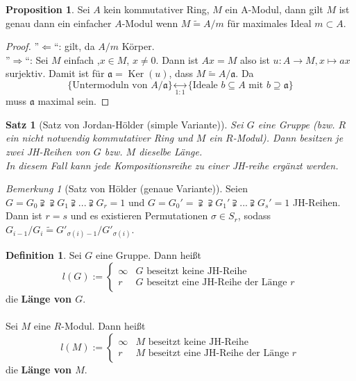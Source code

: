 \documentclass[10pt,a4paper]{article}
\newcommand{\isomorph}{\ensuremath{\tilde{=}}}
\newcommand{\Ker}{\ensuremath{\operatorname{Ker}}}
\newcounter{thm}[section]
\theoremstyle{definition}
\newtheorem{definition}[thm]{Definition}
\newtheorem{prop}[thm]{Proposition}
\theoremstyle{plain}
\newtheorem{satz}[thm]{Satz}
\theoremstyle{remark}
\newtheorem*{bem*}{Bemerkung}
\begin{document}
\begin{prop}
	Sei $A$ kein kommutativer Ring, $M$ ein A-Modul, dann gilt $M$ ist genau dann ein einfacher $A$-Modul wenn $M\isomorph A/m$ für maximales Ideal $m\subset A$.
\end{prop}

\begin{proof}
	''$\Leftarrow$``: gilt, da $A/m$ Körper.\\
	''$\Rightarrow$``: Sei $M$ einfach ,$x\in M$, $x\neq 0$. Dann ist $Ax=M$ also ist $u:A\rightarrow M,x\mapsto ax$ surjektiv. Damit ist für $\mathfrak a=\Ker(u)$, dass $M\isomorph A/\mathfrak a$. Da
	\[\{\text{Untermoduln von $A/\mathfrak a$}\}\underset{1:1}{\leftrightarrow} \{\text{Ideale $b\subseteq A$ mit $b\supseteq \mathfrak a$}\}\]
	muss $\mathfrak a$ maximal sein.
\end{proof}

\begin{satz}[Satz von Jordan-Hölder (simple Variante)]
	Sei $G$ eine Gruppe (bzw. $R$ ein nicht notwendig kommutativer Ring und $M$ ein $R$-Modul). Dann besitzen je zwei JH-Reihen von $G$ bzw. $M$ dieselbe Länge.\\
	In diesem Fall kann jede Kompositionsreihe zu einer JH-reihe ergänzt werden.
\end{satz}

\begin{bem*}[Satz von Hölder (genaue Variante)]
	Seien $G=G_0\supsetneqq\supsetneqq G_1\supsetneqq ...\supsetneqq G_r=1$ und $G=G_0'=\supsetneqq\supsetneqq G_1'\supsetneqq ...\supsetneqq G_s'=1$ JH-Reihen.\\
	Dann ist $r=s$ und es existieren Permutationen $\sigma\in S_r$, sodass $G_{i-1}/G_i\isomorph G'_{\sigma(i)-1}/G'_{\sigma(i)}$.
\end{bem*}

\begin{definition}
	Sei $G$ eine Gruppe. Dann heißt
	\[l(G):=\begin{cases}
	\infty&\text{$G$ beseitzt keine JH-Reihe}\\
	r&\text{$G$ beseitzt eine JH-Reihe der Länge $r$}
	\end{cases}\]
	die \textbf{Länge von $G$}.\\
	\\
	Sei $M$ eine $R$-Modul. Dann heißt
	\[l(M):=\begin{cases}
	\infty&\text{$M$ beseitzt keine JH-Reihe}\\
	r&\text{$M$ beseitzt eine JH-Reihe der Länge $r$}
	\end{cases}\]
	die \textbf{Länge von $M$}.
\end{definition}
\end{document}
